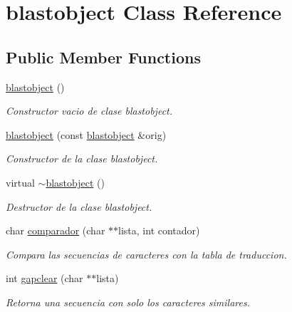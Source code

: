 \hypertarget{classblastobject}{}\section{blastobject Class Reference}
\label{classblastobject}
\subsection*{Public Member Functions}
\begin{DoxyCompactItemize}
\item 
\hypertarget{classblastobject_a1ed96bf0cf72600743a56b37ae6e0c16}{}\label{classblastobject_a1ed96bf0cf72600743a56b37ae6e0c16} 
\hyperlink{classblastobject_a1ed96bf0cf72600743a56b37ae6e0c16}{blastobject} ()
\begin{DoxyCompactList}\small\item\em Constructor vacio de clase blastobject. \end{DoxyCompactList}\item 
\hyperlink{classblastobject_aa6004c11726327285515febd40f26b28}{blastobject} (const \hyperlink{classblastobject}{blastobject} \&orig)
\begin{DoxyCompactList}\small\item\em Constructor de la clase blastobject. \end{DoxyCompactList}\item 
\hypertarget{classblastobject_a5dcb3ba619d57005aa6ed2169fcbf5c3}{}\label{classblastobject_a5dcb3ba619d57005aa6ed2169fcbf5c3} 
virtual \hyperlink{classblastobject_a5dcb3ba619d57005aa6ed2169fcbf5c3}{$\sim$blastobject} ()
\begin{DoxyCompactList}\small\item\em Destructor de la clase blastobject. \end{DoxyCompactList}\item 
char \hyperlink{classblastobject_aeb5a23c8caddb226fa161fe3cb162c23}{comparador} (char $\ast$$\ast$lista, int contador)
\begin{DoxyCompactList}\small\item\em Compara las secuencias de caracteres con la tabla de traduccion. \end{DoxyCompactList}\item 
int \hyperlink{classblastobject_a50f753f559096d95d75ee73ae08b846e}{gapclear} (char $\ast$$\ast$lista)
\begin{DoxyCompactList}\small\item\em Retorna una secuencia con solo los caracteres similares. \end{DoxyCompactList}\item 

\end{DoxyCompactItemize}
